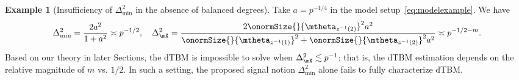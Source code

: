 \documentclass[lettersize,onecolumn,journal]{IEEEtran}
\theoremstyle{definition}
\theoremstyle{definition}
\newtheorem{example}{Example}
\begin{document}
{\begin{example}[Insufficiency of $\Delta_{\min}^2$ in the absence of balanced degrees]
 Take $ a = p^{-1/4}$ in the model setup~\eqref{eq:modelexample}. We have 
\begin{equation}
    \Delta_{\min}^2 = \frac{2 a^2}{1 + a^2} \asymp p^{-1/2}, \quad  \Delta_{\mX}^2 = \frac{2\onormSize{}{\mtheta_{z^{-1}(2)}}^{2} a^2}{\onormSize{}{\mtheta_{z^{-1}(1)}}^{2} +  \onormSize{}{\mtheta_{z^{-1}(2)}}^{2}a^2} \asymp p^{-1/2-m}.
\end{equation}
{\color{red}Based on our theory in later Sections, the dTBM is impossible to solve when $\Delta^2_{\mX} \lesssim p^{-1}$; 
}
that is, the dTBM estimation depends on the relative magnitude of $m$ vs. $1/2$. In such a setting, the proposed signal notion $\Delta^2_{\min}$ alone fails to fully characterize dTBM. 
\textcolor{red}{}

\end{example}

}
\end{document}
